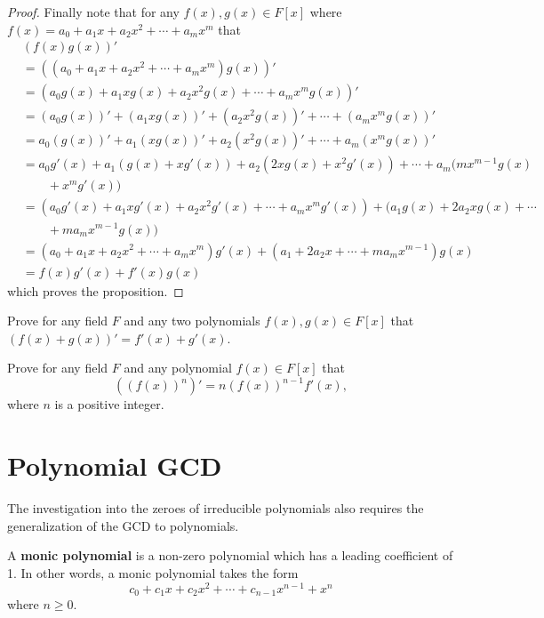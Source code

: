 \begin{proof}
    Finally note that for any $f(x), g(x) \in F[x]$ where $f(x) = a_0 + a_1x + a_2x^2 + \cdots + a_mx^m$ that
    \begin{align*}
        &(f(x)g(x))'\\
        &= \left((a_0 + a_1x + a_2x^2 + \cdots + a_mx^m)g(x)\right)'\\
        &= \left(a_0g(x) + a_1xg(x) + a_2x^2g(x) + \cdots + a_mx^mg(x)\right)'\\
        &= (a_0g(x))' + (a_1xg(x))' + (a_2x^2g(x))' + \cdots + (a_mx^mg(x))'\\
        &= a_0(g(x))' + a_1(xg(x))' + a_2(x^2g(x))' + \cdots + a_m(x^mg(x))'\\
        &= a_0g'(x) + a_1(g(x) + xg'(x)) + a_2(2xg(x) + x^2g'(x)) + \cdots + a_m(mx^{m-1}g(x)\\
        &\quad\quad+ x^mg'(x))\\
        &= (a_0g'(x) + a_1xg'(x) + a_2x^2g'(x) + \cdots + a_mx^mg'(x)) + (a_1g(x) + 2a_2xg(x) + \cdots\\
        &\quad\quad+ ma_mx^{m-1}g(x))\\
        &= (a_0 + a_1x + a_2x^2 + \cdots + a_mx^m)g'(x) + (a_1 + 2a_2x + \cdots + ma_mx^{m-1})g(x)\\
        &= f(x)g'(x) + f'(x)g(x)
    \end{align*}
    which proves the proposition.
\end{proof}

\begin{exercise}\label{exercise-derivative-sum-rule}
    Prove for any field $F$ and any two polynomials $f(x), g(x) \in F[x]$ that $(f(x)+g(x))' = f'(x) + g'(x)$.
\end{exercise}

\begin{exercise}
    Prove for any field $F$ and any polynomial $f(x) \in F[x]$ that
    \[
        \left((f(x))^n\right)' = n(f(x))^{n-1}f'(x),
    \]
    where $n$ is a positive integer.
\end{exercise}

\section{Polynomial GCD}
The investigation into the zeroes of irreducible polynomials also requires the generalization of the GCD to polynomials.

\begin{definition}
    A \textbf{monic polynomial} is a non-zero polynomial which has a leading coefficient of 1. In other words, a monic polynomial takes the form
    \[
        c_0 + c_1x + c_2x^2 + \cdots + c_{n-1}x^{n-1} + x^n
    \]
    where $n \geq 0$.
\end{definition}

